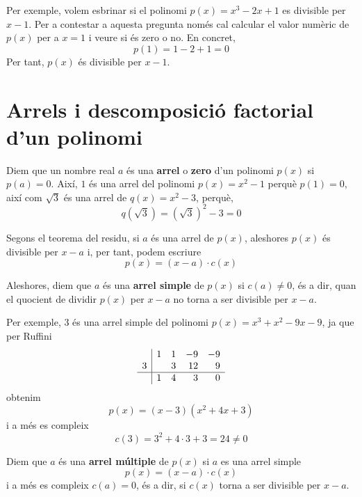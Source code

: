 Per exemple, volem esbrinar si el polinomi $p(x)=x^{3}-2x+1$ es
divisible per $x-1$. Per a contestar a aquesta pregunta només cal
calcular el valor numèric de $p(x)$ per a $x=1$ i veure si és zero o no.
En concret,\begin{equation*}
p(1)=1-2+1=0
\end{equation*}Per tant, $p(x)$ és divisible per \thinspace $x-1$.

\section{Arrels i descomposició factorial d'un polinomi}

Diem que un nombre real $a$ és una \textbf{arrel} o \textbf{zero}
d'un polinomi $p(x)$ si $p(a)=0$. Així, $1$ és una arrel del
polinomi $p(x)=x^{2}-1$ perquè $p(1)=0$, així com $\sqrt{3}$ és una arrel de $q(x)=x^{2}-3$, perquè,\begin{equation*}
q(\sqrt{3})=\left( \sqrt{3}\right) ^{2}-3=0
\end{equation*}

Segons el teorema del residu, si $a$ és una arrel de $p(x)$, aleshores $p(x)$ és divisible per $x-a$ i, per tant, podem escriure\begin{equation*}
p(x)=(x-a)\cdot c(x)
\end{equation*}

Aleshores, diem que $a$ és una \textbf{arrel simple} de $p(x)$ si $c(a)\neq 0$, és a dir, quan el quocient de dividir $p(x)$ per $x-a$ no
torna a ser divisible per $x-a$.

Per exemple, $3$ és una arrel simple del polinomi $p(x)=x^{3}+x^{2}-9x-9 $, ja que per Ruffini\begin{equation*}
\begin{array}{r|rrrr}
& 1 & 1 & -9 & -9 \\
3 & & 3 & 12 & 9 \\ \hline
& 1 & 4 & 3 & 0\end{array}\end{equation*}obtenim\begin{equation*}
p(x)=(x-3)(x^{2}+4x+3)
\end{equation*}i a més es compleix\begin{equation*}
c(3)=3^{2}+4\cdot 3+3=24\neq 0
\end{equation*}

Diem que $a$ és una \textbf{arrel múltiple} de $p(x)$ si $a$ es
una arrel simple
\begin{equation*}
p(x)=(x-a)\cdot c(x)
\end{equation*}i a més es compleix $c(a)=0$, és a dir, si $c(x)$ torna a ser divisible
per $x-a$.

